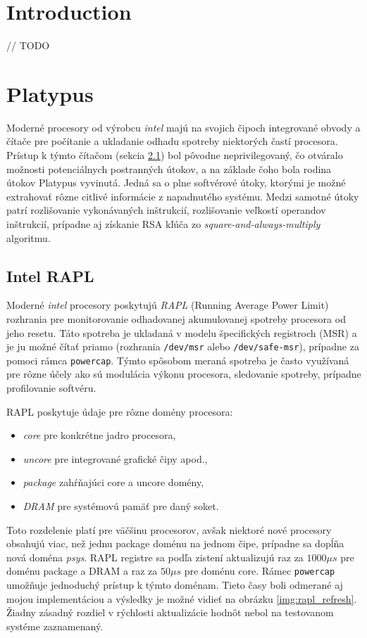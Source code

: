 \newcommand{\code}{\texttt}

\chapter{Introduction}
// TODO

\chapter{Platypus}
Moderné procesory od výrobcu \emph{intel} majú na svojich čipoch integrované obvody a čítače pre počítanie a ukladanie odhadu spotreby niektorých častí procesora.
Prístup k týmto čítačom (sekcia \ref{sec:rapl}) bol pôvodne neprivilegovaný, čo otváralo možnosti potenciálnych postranných útokov, a na základe čoho bola rodina útokov
Platypus vyvinutá. Jedná sa o plne softvérové útoky, ktorými je možné extrahovať rôzne citlivé informácie z napadnutého systému. Medzi samotné útoky
patrí rozlišovanie vykonávaných inštrukcií, rozlišovanie veľkostí operandov inštrukcií, prípadne aj získanie RSA kľúča zo \emph{square-and-always-multiply} algoritmu.

\section{Intel RAPL} \label{sec:rapl}
Moderné \emph{intel} procesory poskytujú \emph{RAPL} (Running Average Power Limit) rozhrania pre monitorovanie odhadovanej akumulovanej spotreby procesora
od jeho resetu. Táto spotreba je ukladaná v modelu špecifických registroch (MSR) a je ju možné čítať priamo (rozhrania \code{/dev/msr} alebo \code{/dev/safe-msr}),
prípadne za pomoci rámca \code{powercap}. Týmto spôsobom meraná spotreba je často využívaná pre rôzne účely ako sú modulácia výkonu procesora,
sledovanie spotreby, prípadne profilovanie softvéru.

RAPL poskytuje údaje pre rôzne domény procesora:
\begin{itemize}
    \item \emph{core} pre konkrétne jadro procesora,
    \item \emph{uncore} pre integrované grafické čipy apod.,
    \item \emph{package} zahŕňajúci core a uncore domény,
    \item \emph{DRAM} pre systémovú pamäť pre daný soket.
\end{itemize}
Toto rozdelenie platí pre väčšinu procesorov, avšak niektoré nové procesory obsahujú viac, než jednu package doménu na jednom čipe, prípadne sa dopĺňa
nová doména \emph{psys}. %
RAPL registre sa podľa zistení \cite{Platypus} aktualizujú raz za $1000 \mu s$ pre doménu package a DRAM a raz za $50 \mu s$ pre doménu core.
Rámec \code{powercap} umožňuje jednoduchý prístup k týmto doménam. Tieto časy boli odmerané aj mojou implementáciou a výsledky je možné vidieť na
obrázku \ref{img:rapl_refresh}. Žiadny zásadný rozdiel v rýchlosti aktualizácie hodnôt nebol na testovanom systéme zaznamenaný.

